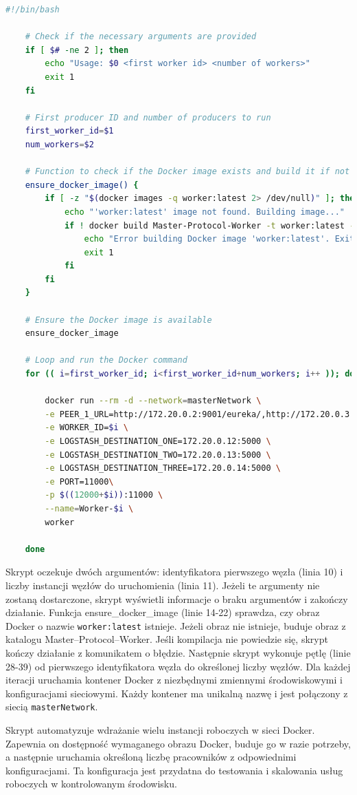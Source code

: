 \begin{lstlisting}[language=bash,caption=Kod skryptu workers.sh,label=workersBashScript]
    #!/bin/bash

    # Check if the necessary arguments are provided
    if [ $# -ne 2 ]; then
        echo "Usage: $0 <first worker id> <number of workers>"
        exit 1
    fi
    
    # First producer ID and number of producers to run
    first_worker_id=$1
    num_workers=$2
    
    # Function to check if the Docker image exists and build it if not
    ensure_docker_image() {
        if [ -z "$(docker images -q worker:latest 2> /dev/null)" ]; then
            echo "'worker:latest' image not found. Building image..."
            if ! docker build Master-Protocol-Worker -t worker:latest --no-cache; then
                echo "Error building Docker image 'worker:latest'. Exiting."
                exit 1
            fi
        fi
    }
    
    # Ensure the Docker image is available
    ensure_docker_image
    
    # Loop and run the Docker command
    for (( i=first_worker_id; i<first_worker_id+num_workers; i++ )); do
    
        docker run --rm -d --network=masterNetwork \
        -e PEER_1_URL=http://172.20.0.2:9001/eureka/,http://172.20.0.3:9002/eureka/,http://172.20.0.4:9003/eureka/ \
        -e WORKER_ID=$i \
        -e LOGSTASH_DESTINATION_ONE=172.20.0.12:5000 \
        -e LOGSTASH_DESTINATION_TWO=172.20.0.13:5000 \
        -e LOGSTASH_DESTINATION_THREE=172.20.0.14:5000 \
        -e PORT=11000\
        -p $((12000+$i)):11000 \
        --name=Worker-$i \
        worker
    
    done
\end{lstlisting}

Skrypt oczekuje dwóch argumentów: identyfikatora pierwszego węzła (linia 10) i liczby instancji węzłów do uruchomienia (linia 11). Jeżeli te argumenty nie zostaną dostarczone, skrypt wyświetli informacje o braku argumentów i zakończy działanie. Funkcja ensure\_docker\_image (linie 14-22) sprawdza, czy obraz Docker o nazwie \verb|worker:latest| istnieje. Jeżeli obraz nie istnieje, buduje obraz z katalogu Master--Protocol--Worker. Jeśli kompilacja nie powiedzie się, skrypt kończy działanie z komunikatem o błędzie. Następnie skrypt wykonuje pętlę (linie 28-39) od pierwszego identyfikatora węzła do określonej liczby węzłów. Dla każdej iteracji uruchamia kontener Docker z niezbędnymi zmiennymi środowiskowymi i konfiguracjami sieciowymi. Każdy kontener ma unikalną nazwę i jest połączony z siecią \verb|masterNetwork|.

Skrypt automatyzuje wdrażanie wielu instancji roboczych w sieci Docker. Zapewnia on dostępność wymaganego obrazu Docker, buduje go w razie potrzeby, a następnie uruchamia określoną liczbę pracowników z odpowiednimi konfiguracjami. Ta konfiguracja jest przydatna do testowania i skalowania usług roboczych w kontrolowanym środowisku.
